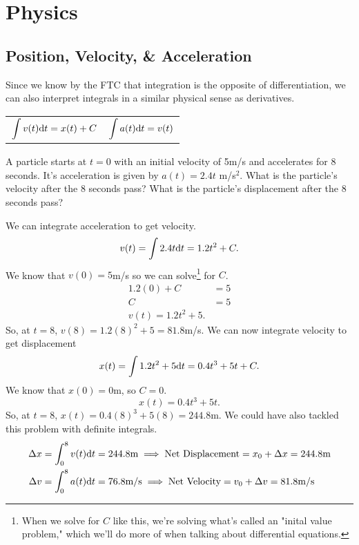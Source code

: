 \section{Physics}
\subsection{Position, Velocity, \& Acceleration}
Since we know by the FTC that integration is the opposite of differentiation, we can also interpret integrals in a similar physical sense as derivatives.
\begin{table}[H]
	\begin{center}
		\begin{tabular}{ l l }
			$\begin{aligned}\int{v(t)\mathrm{d} t}=x(t) + C\end{aligned}$ & $\begin{aligned}\int{a(t)\mathrm{d} t}=v(t)\end{aligned}$
		\end{tabular}
	\end{center}
\end{table}

\begin{example}
	A particle starts at $t=0$ with an initial velocity of 5m/s and accelerates for 8 seconds.
	It's acceleration is given by $a(t)=2.4t$ m/s$^2$.
	What is the particle's velocity after the 8 seconds pass?
	What is the particle's displacement after the 8 seconds pass?
\end{example}
We can integrate acceleration to get velocity.
\begin{equation*}
	v(t) = \int{2.4t\mathrm{d} t} = 1.2t^2 + C.
\end{equation*}
\indent
We know that $v(0)=5$m/s so we can solve\footnote{When we solve for $C$ like this, we're solving what's called an "inital value problem," which we'll do more of when talking about differential equations.} for $C$.
\begin{align*}
	1.2(0) + C &= 5 \\
	C &= 5 \\
	v(t) = 1.2t^2 + 5.
\end{align*}
\indent
So, at $t=8$, $v(8) = 1.2(8)^2 + 5 = 81.8$m/s.
We can now integrate velocity to get displacement
\begin{equation*}
	x(t) = \int{1.2t^2 + 5 \mathrm{d} t} = 0.4t^3 + 5t + C.
\end{equation*}
\indent
We know that $x(0)=0$m, so $C=0$.
\begin{equation*}
	x(t) = 0.4t^3 + 5t.
\end{equation*}
\indent
So, at $t=8$, $x(t) = 0.4(8)^3 + 5(8) = 244.8$m.
We could have also tackled this problem with definite integrals.
\begin{align*}
	\Delta x = \int_{0}^{8}{v(t)\mathrm{d} t} &= 244.8\text{m} \implies \text{Net Displacement} = x_0 + \Delta x = 244.8\text{m} \\
	\Delta v = \int_{0}^{8}{a(t)\mathrm{d} t} &= 76.8\text{m/s} \implies \text{Net Velocity} = v_0 + \Delta v = 81.8\text{m/s}
\end{align*}

